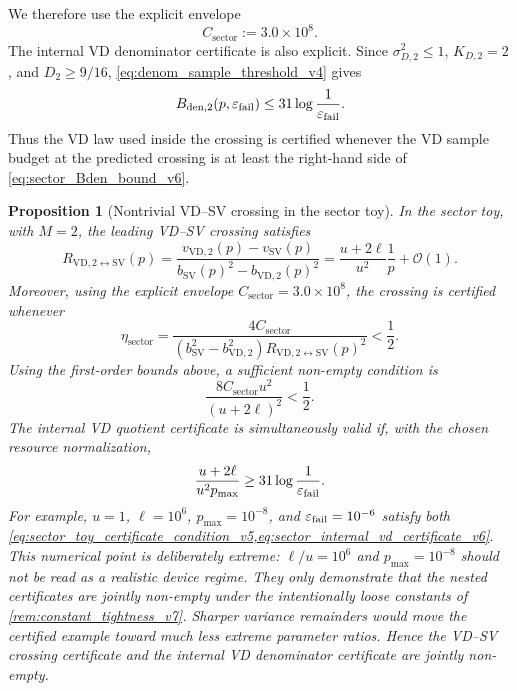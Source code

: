 \documentclass[11pt]{article}
\newtheorem{proposition}{Proposition}
\newcommand{\1}{\mathbf{1}}
\newcommand{\OO}{\mathcal{O}}
\begin{document}
We therefore use the explicit envelope
\begin{equation}
    C_{\mathrm{sector}}:=3.0\times10^8.
    \label{eq:Csector_numeric_v6}
\end{equation}
The internal VD denominator certificate is also explicit.  Since \(\sigma_{D,2}^2\le1\), \(K_{D,2}=2\), and \(D_2\ge9/16\), \cref{eq:denom_sample_threshold_v4} gives
\begin{equation}
    B_{\mathrm{den},2}(p,\varepsilon_{\rm fail})
    \le 31\log\frac1{\varepsilon_{\rm fail}}.
    \label{eq:sector_Bden_bound_v6}
\end{equation}
Thus the VD law used inside the crossing is certified whenever the VD sample budget at the predicted crossing is at least the right-hand side of \cref{eq:sector_Bden_bound_v6}.

\begin{proposition}[Nontrivial VD--SV crossing in the sector toy]
\label{prop:sector_toy_vd_sv_crossing_v5}
In the sector toy, with \(M=2\), the leading VD--SV crossing satisfies
\begin{equation}
    R_{\mathrm{VD},2\leftrightarrow\mathrm{SV}}(p)
    =\frac{v_{\mathrm{VD},2}(p)-v_{\mathrm{SV}}(p)}{b_{\mathrm{SV}}(p)^2-b_{\mathrm{VD},2}(p)^2}
    =\frac{u+2\ell}{u^2}\frac1p+\OO(1).
    \label{eq:sector_toy_vd_sv_crossing_v5}
\end{equation}
Moreover, using the explicit envelope \(C_{\mathrm{sector}}=3.0\times10^8\), the crossing is certified whenever
\begin{equation}
    \eta_{\mathrm{sector}}
    =\frac{4C_{\mathrm{sector}}}{(b_{\mathrm{SV}}^2-b_{\mathrm{VD},2}^2)R_{\mathrm{VD},2\leftrightarrow\mathrm{SV}}(p)^2}<\frac12.
\end{equation}
Using the first-order bounds above, a sufficient non-empty condition is
\begin{equation}
    \frac{8C_{\mathrm{sector}}u^2}{(u+2\ell)^2}<\frac12.
    \label{eq:sector_toy_certificate_condition_v5}
\end{equation}
The internal VD quotient certificate is simultaneously valid if, with the chosen resource normalization,
\begin{equation}
    \frac{u+2\ell}{u^2p_{\max}}
    \ge 31\log\frac1{\varepsilon_{\rm fail}}.
    \label{eq:sector_internal_vd_certificate_v6}
\end{equation}
For example, \(u=1\), \(\ell=10^6\), \(p_{\max}=10^{-8}\), and \(\varepsilon_{\rm fail}=10^{-6}\) satisfy both \cref{eq:sector_toy_certificate_condition_v5,eq:sector_internal_vd_certificate_v6}.  This numerical point is deliberately extreme: \(\ell/u=10^6\) and \(p_{\max}=10^{-8}\) should not be read as a realistic device regime.  They only demonstrate that the nested certificates are jointly non-empty under the intentionally loose constants of \cref{rem:constant_tightness_v7}.  Sharper variance remainders would move the certified example toward much less extreme parameter ratios.  Hence the VD--SV crossing certificate and the internal VD denominator certificate are jointly non-empty.
\end{proposition}
\end{document}
